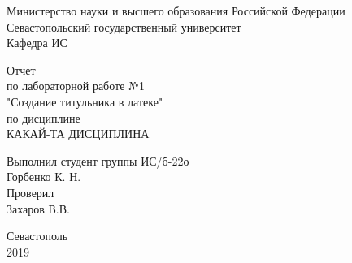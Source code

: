 \documentclass[a4paper,14pt]{extarticle}
\newcommand{\mylabnumber}{1}
\newcommand{\mylabtitle}{Создание титульника в латеке}
\newcommand{\mysubject}{Какай-та дисциплина}
\newcommand{\mylecturer}{Захаров В.В.}
\begin{document}
    \lstset{ %
        basicstyle=\footnotesize\ttfamily,
        numbersep=5pt,
        tabsize=4,
        gobble=8,
        extendedchars=\true,
        keepspaces=\true,
        numbers=left,
        stringstyle=\ttfamily,
        showstringspaces=\false
    }


    \begin{titlepage}
        
        \thispagestyle{empty}
        
        \begin{center}
            
            Министерство науки и высшего образования Российской Федерации \\
            Севастопольский государственный университет \\
            Кафедра ИС
            
            \vfill
            \large{
                Отчет \\
                по лабораторной работе №\mylabnumber \\
                "\mylabtitle" \\
                по дисциплине \\
                \MakeTextUppercase{\mysubject}
            }

        \end{center}

        \vspace{1cm}

        \noindent\hspace{7.5cm} Выполнил студент группы ИС/б-22о \\
        \null\hspace{7.5cm} Горбенко К. Н. \\
        \null\hspace{7.5cm} Проверил \\
        \null\hspace{7.5cm} \mylecturer

        \vfill

        \begin{center}
            Севастополь \\
            2019
        \end{center}

    \end{titlepage}
\end{document}
